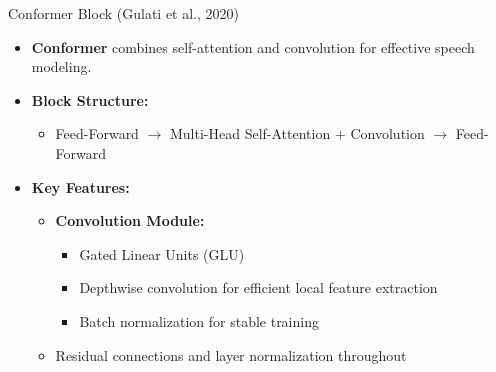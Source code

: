 \begin{frame}{Conformer Block (Gulati et al., 2020)}
    \begin{itemize}
        \item \textbf{Conformer} combines self-attention and convolution for effective speech modeling.
        \item \textbf{Block Structure:}
        \begin{itemize}
            \item Feed-Forward $\rightarrow$ Multi-Head Self-Attention $+$ Convolution $\rightarrow$ Feed-Forward
        \end{itemize}
        \item \textbf{Key Features:}
        \begin{itemize}
            \item \textbf{Convolution Module:}
            \begin{itemize}
                \item Gated Linear Units (GLU)
                \item Depthwise convolution for efficient local feature extraction
                \item Batch normalization for stable training
            \end{itemize}
            \item Residual connections and layer normalization throughout
        \end{itemize}
    \end{itemize}
\end{frame}







